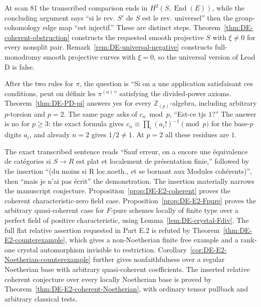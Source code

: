 \begin{remark}\label{rem:DE-quote-D2}
At scan 81 the transcribed comparison ends in $H^2(S,\operatorname{End}(E))$, while the concluding argument says ``si le rev. $S'$ de $S$ est le rev. universel'' then the group-cohomology edge map ``est injectif.''  These are distinct steps.  Theorem~\ref{thm:DE-coherent-obstruction} constructs the requested smooth projective $S$ with $\xi\ne0$ for every nonsplit pair.  Remark~\ref{rem:DE-universal-negative} constructs full-monodromy smooth projective curves with $\xi=0$, so the universal version of Lead D is false.
\end{remark}

\begin{remark}\label{rem:DE-quote-E1}
After the two rules for $\pi$, the question is ``Si on a une application satisfaisant ces conditions, peut on définir les $\pi^{(n)}$'' satisfying the divided-power axioms.  Theorem~\ref{thm:DE-PD-pi} answers yes for every $\mathbb Z_{(p)}$-algebra, including arbitrary $p$-torsion and $p=2$.  The same page asks of $c_n\bmod p$, ``Est-ce tjs $1$?''  The answer is no for $p\geq3$: the exact formula gives $c_n\equiv\prod_i(a_i!)^{-1}\pmod p$ for the base-$p$ digits $a_i$, and already $n=2$ gives $1/2\ne1$.  At $p=2$ all these residues are $1$.
\end{remark}

\begin{remark}\label{rem:DE-quote-E2}
The exact transcribed sentence reads ``Sauf erreur, on a encore une équivalence de catégories si $S\to R$ est plat et localement de présentation finie,'' followed by the insertion ``(du moins si R loc.noeth., et se bornant aux Modules cohérents)'', then ``mais je n'ai pas écrit'' the demonstration.  The insertion materially narrows the manuscript conjecture.  Proposition~\ref{prop:DE-E2-coherent} proves the coherent characteristic-zero field case.  Proposition~\ref{prop:DE-E2-Fpure} proves the arbitrary quasi-coherent case for $F$-pure schemes locally of finite type over a perfect field of positive characteristic, using Lemma~\ref{lem:DE-crystal-Fdiv}.  The full flat relative assertion requested in Part E.2 is refuted by Theorem~\ref{thm:DE-E2-counterexample}, which gives a non-Noetherian finite free example and a rank-one crystal automorphism invisible to restriction.  Corollary~\ref{cor:DE-E2-Noetherian-counterexample} further gives nonfaithfulness over a regular Noetherian base with arbitrary quasi-coherent coefficients.  The inserted relative coherent conjecture over every locally Noetherian base is proved by Theorem~\ref{thm:DE-E2-coherent-Noetherian}, with ordinary tensor pullback and arbitrary classical tests.
\end{remark}

